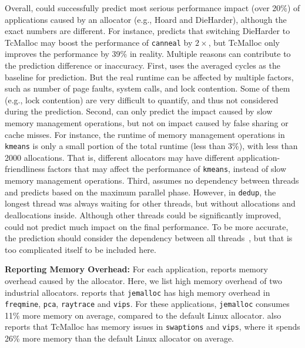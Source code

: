 Overall, \MP{} could successfully predict most serious performance impact (over 20\%) of  applications caused by an allocator (e.g., Hoard and DieHarder), although the exact numbers are different. For instance, \MP{} predicts that switching DieHarder to TcMalloc may boost the performance of \texttt{canneal} by $2\times$, but TcMalloc only improves the performance by 39\% in reality. Multiple reasons can contribute to the prediction difference or inaccuracy. First, \MP{} uses the averaged cycles as the baseline for prediction. But the real runtime can be affected by multiple factors, such as number of page faults, system calls, and lock contention. Some of them (e.g., lock contention) are very difficult to quantify, and thus not considered during the prediction. Second, \MP{} can only predict the impact caused by slow memory management operations, but not on impact caused by false sharing or cache misses. For instance, the runtime of memory management operations in \texttt{kmeans} is only a small portion of the total runtime (less than 3\%), with less than 2000 allocations. That is, different allocators may have different application-friendliness factors that may affect the performance of \texttt{kmeans}, instead of slow memory management operations.  Third, \MP{} assumes no dependency between threads and predicts  based on the maximum parallel phase. However, in \texttt{dedup}, the longest thread was always waiting for other threads, but without allocations and deallocations inside. Although other threads could be significantly improved, \MP{} could not predict much impact on the final performance. To be more accurate, the prediction should consider the dependency between all threads~\cite{wPerf}, but that is too complicated itself to be included here.

\textbf{Reporting Memory Overhead:} 
For each application, \MP{} reports memory overhead caused by the allocator. Here, we list high memory overhead of two industrial allocators. \MP{} reports that \texttt{jemalloc} has high memory overhead in \texttt{freqmine}, \texttt{pca}, \texttt{raytrace} and \texttt{vips}. For these applications, \texttt{jemalloc} consumes 11\% more memory on average, compared to the default Linux allocator. \MP{} also reports that TcMalloc has memory issues in \texttt{swaptions} and \texttt{vips}, where it spends 26\% more memory than the default Linux allocator on average. 


